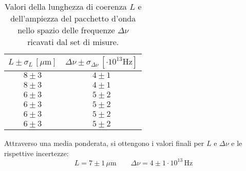 \documentclass[]{article}
\begin{document}
\begin{table}[H]
    \centering
    \begin{tabular}{||c|c||}
        \hline
        $L \pm \sigma_{L} \, \left[\mu\text{m}\right]$ & $\Delta \nu \pm \sigma_{\Delta \nu} \, \left[\cdot 10^{13}\text{Hz}\right]$ \\
        \hline\hline

        $8 \pm 3$ & $4 \pm 1$ \\\hline
        $8 \pm 3$ & $4 \pm 1$ \\\hline
        $6 \pm 3$ & $5 \pm 2$ \\\hline
        $6 \pm 3$ & $5 \pm 2$ \\\hline
        $6 \pm 3$ & $5 \pm 2$ \\\hline
        $6 \pm 3$ & $5 \pm 2$ \\\hline
    
    \end{tabular}
    \caption{Valori della lunghezza di coerenza $L$ e dell'ampiezza del pacchetto d'onda nello spazio delle frequenze $\Delta \nu$ ricavati dal set di misure.}
    \label{tab:L}
\end{table}
Attraverso una media ponderata, si ottengono i valori finali per $L$ e $\Delta \nu$ e le rispettive incertezze:
\begin{equation}
    \label{L-deltanu}
    L = 7 \pm 1 \, \mu\text{m} \qquad
    \Delta\nu = 4 \pm 1 \cdot 10^{13} \, \text{Hz}
\end{equation}
\end{document}
